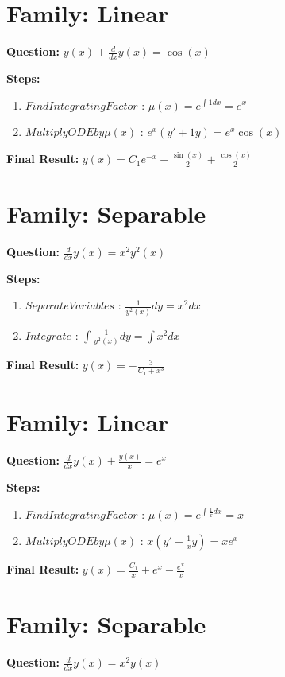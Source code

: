 \documentclass{article}
\begin{document}
\section*{Family: Linear}
\textbf{Question:} $y{\left(x \right)} + \frac{d}{d x} y{\left(x \right)} = \cos{\left(x \right)}$

\textbf{Steps:}
\begin{enumerate}
\item $Find Integrating Factor$ :  $\mu(x) = e^{\int 1 dx} = e^{x}$
\item $Multiply ODE by \mu(x)$ :  $e^{x}(y' + 1y) = e^{x} \cos{\left(x \right)}$
\end{enumerate}
\textbf{Final Result:} $y{\left(x \right)} = C_{1} e^{- x} + \frac{\sin{\left(x \right)}}{2} + \frac{\cos{\left(x \right)}}{2}$

\section*{Family: Separable}
\textbf{Question:} $\frac{d}{d x} y{\left(x \right)} = x^{2} y^{2}{\left(x \right)}$

\textbf{Steps:}
\begin{enumerate}
\item $Separate Variables$ :  $\frac{1}{y^{2}{\left(x \right)}} dy = x^{2} dx$
\item $Integrate$ :  $\int \frac{1}{y^{2}{\left(x \right)}} dy = \int x^{2} dx$
\end{enumerate}
\textbf{Final Result:} $y{\left(x \right)} = - \frac{3}{C_{1} + x^{3}}$

\section*{Family: Linear}
\textbf{Question:} $\frac{d}{d x} y{\left(x \right)} + \frac{y{\left(x \right)}}{x} = e^{x}$

\textbf{Steps:}
\begin{enumerate}
\item $Find Integrating Factor$ :  $\mu(x) = e^{\int \frac{1}{x} dx} = x$
\item $Multiply ODE by \mu(x)$ :  $x(y' + \frac{1}{x}y) = x e^{x}$
\end{enumerate}
\textbf{Final Result:} $y{\left(x \right)} = \frac{C_{1}}{x} + e^{x} - \frac{e^{x}}{x}$

\section*{Family: Separable}
\textbf{Question:} $\frac{d}{d x} y{\left(x \right)} = x^{2} y{\left(x \right)}$
\end{document}
